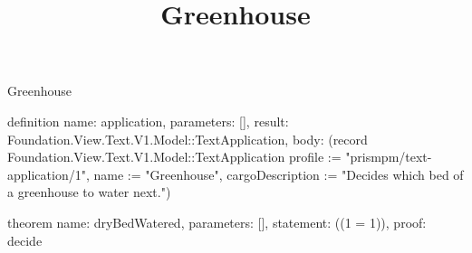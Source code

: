 \begin{lexlean}{Greenhouse}
\title{Greenhouse}
\begin{semanticmodule}
definition{
  name: application,
  parameters: [],
  result: Foundation.View.Text.V1.Model::TextApplication,
  body: (record Foundation.View.Text.V1.Model::TextApplication {profile := "prismpm/text-application/1", name := "Greenhouse", cargoDescription := "Decides which bed of a greenhouse to water next."})
}

theorem{
  name: dryBedWatered,
  parameters: [],
  statement: ((1 = 1)),
  proof: decide{}
}
\end{semanticmodule}
\end{lexlean}
